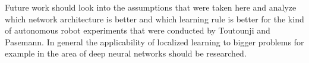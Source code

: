 \documentclass[12pt,twoside]{scrartcl}
\theoremstyle{plain}
\theoremstyle{definition}
\theoremstyle{remark}
\begin{document}
Future work should look into the assumptions that were taken here and analyze which
network architecture is better and which learning rule is better for the kind of
autonomous robot experiments that were conducted by Toutounji and Pasemann. In
general the applicability of localized learning to bigger problems for example
in the area of deep neural networks should be researched.

%
%
\newpage
\printbibliography
{}%
\end{document}
